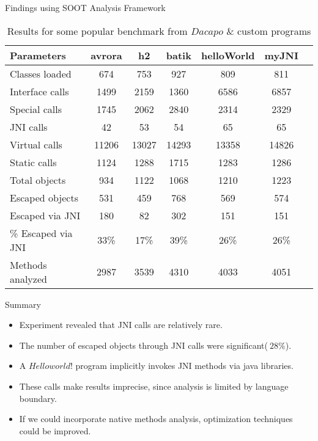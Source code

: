 \begin{frame}{Findings using SOOT Analysis Framework}
    \begin{table}[H]
        \label{tab:jni_analysis_results}
        \begin{tabular}{|l|c|c|c|c|c|c|}
            \hline
            \textbf{Parameters} & \textbf{avrora} & \textbf{h2} & \textbf{batik}  & \textbf{helloWorld} & \textbf{myJNI} \\
            \hline
            Classes loaded          & 674  & 753  & 927  & 809  & 811  \\
            Interface calls          & 1499  & 2159  & 1360  & 6586  & 6857  \\
            Special calls           & 1745  & 2062  & 2840   & 2314  & 2329  \\
            JNI calls               & 42   & 53   & 54    & 65   & 65   \\
            Virtual calls           & 11206 & 13027 & 14293  & 13358 & 14826 \\
            Static calls            & 1124 & 1288  & 1715  & 1283  & 1286  \\
            Total objects          & 934  & 1122  & 1068  & 1210  & 1223 \\
            Escaped objects         & 531  & 459  & 768    & 569  & 574  \\
            Escaped via JNI         & 180   & 82   & 302     & 151   & 151   \\
            \% Escaped via JNI     & 33\%  & 17\%  & 39\%   & 26\%  & 26\%   \\
            Methods analyzed        & 2987 & 3539 & 4310 & 4033 & 4051 \\
            \hline
        \end{tabular}
        \caption{Results for some popular benchmark from $Dacapo$ \& custom programs}
    \end{table}

\end{frame}

\begin{frame}{Summary}
       \begin{itemize}
        \vspace{3mm}
        \item Experiment revealed that JNI calls are relatively rare.
        \vspace{3mm}
        \item The number of escaped objects through JNI calls were significant($~28\%$).
        \vspace{3mm}
        \item A $Hello world!$ program implicitly invokes JNI methods via java libraries.
        \vspace{3mm}
        \item These calls make results imprecise, since analysis is limited by language boundary.
        \vspace{3mm}
        \item If we could incorporate native methods analysis, optimization techniques could be improved.
    \end{itemize}
\end{frame}
